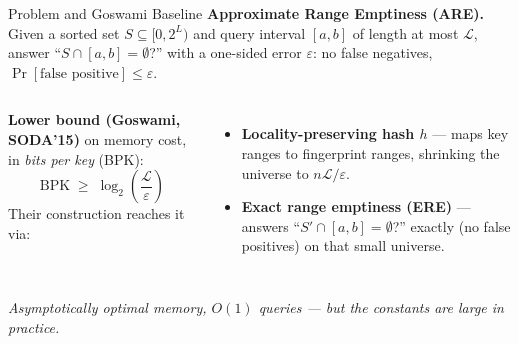 \begin{frame}{Problem and Goswami Baseline}
  \textbf{Approximate Range Emptiness (ARE).}
  Given a sorted set $S \subseteq [0, 2^L)$ and query interval $[a, b]$
  of length at most $\mathcal{L}$, answer ``$S \cap [a, b] = \emptyset$?''
  with a one-sided error $\varepsilon$: no false negatives,
  $\Pr[\text{false positive}] \leq \varepsilon$.
  \vspace{0.4em}

  \begin{columns}[c,onlytextwidth]
    \textbf{Lower bound (Goswami, SODA'15)} on memory cost,
    in \emph{bits per key} (BPK):
    \[
      \mathrm{BPK} \;\geq\; \log_2\!\left(\frac{\mathcal{L}}{\varepsilon}\right)
    \]
    Their construction reaches it via:
    \begin{itemize}
      \item \textbf{Locality-preserving hash $h$} --- maps key ranges to
            fingerprint ranges, shrinking the universe to
            $n\mathcal{L}/\varepsilon$.
      \item \textbf{Exact range emptiness (ERE)} --- answers
            ``$S' \cap [a,b] = \emptyset$?'' exactly (no false positives) on
            that small universe.
    \end{itemize}

    \centering
    \scalebox{0.85}{\HashEREpipeline}
  \end{columns}

  \begin{center}
    \textit{Asymptotically optimal memory, $O(1)$ queries --- but the constants are large in practice.}
  \end{center}
\end{frame}
